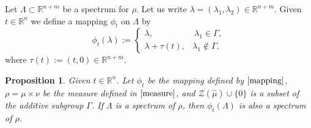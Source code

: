 \documentclass[reqno,a4paper,12pt]{amsart}
\numberwithin{equation}{section}
\newcommand{\R}{{\mathbb R}}
\newcounter{rem}
\newtheorem{proposition}[theorem]{Proposition}
\theoremstyle{remark}
\numberwithin{equation}{section}
\def\R{\mathbb{R}}
\begin{document}
Let $ \Lambda\subset \R^{n+m}$ be a spectrum for $\rho$. Let us write $\lambda = (\lambda_1,\lambda_2)\in \R^{n+m}$. Given $t\in \R^n$ we define a mapping  $\phi_{t}$ on $\Lambda$ by
\begin{equation}\label{mapping}
\phi_{t}(\lambda):=
\left\{\begin{matrix}
\lambda,\ \ \ \ \ \ \ \ \ & \ \lambda_{1}\in  \Gamma,\\
\lambda+\tau(t),& \lambda_{1}\notin \Gamma,
\end{matrix}\right.
\end{equation}
where $\tau(t):=(t,0)\in \mathbb{R}^{n+m}$. 

\begin{proposition}\label{mapspectrum}
 Given $t\in \R^n$. Let $\phi_{t}$ be the mapping defined by $\eqref{mapping}$, $\rho=\mu\times\nu$ be the measure defined in $\eqref{measure}$, and ${\mathcal Z}(\widehat{\mu})\cup \{0\}$ is a subset of  the {additive} subgroup $\Gamma$. If $\Lambda$ is a spectrum of $\rho$, then
$\phi_{t}(\Lambda)$ is also a spectrum of $\rho$.
\end{proposition}
\end{document}
